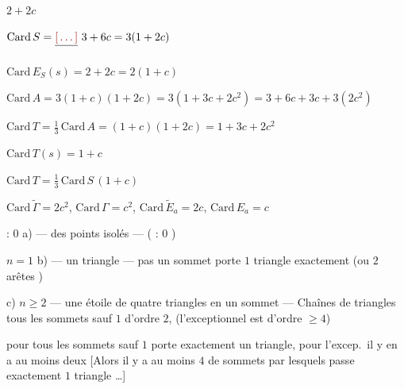 \documentclass[11pt,a4paper]{article}
\begin{document}

$2+2c$ \qquad {}

$\mathrm{Card}\,S=\struck{\ill{}}\ 3+6c=3(1+2c)$

$\mathrm{Card}\,E_S(s)=2+2c=2(1+c)$

$\mathrm{Card}\,A=3(1+c)(1+2c)=3(1+3c+2c^2)=3+6c+3c+3(2c^2)$

$\mathrm{Card}\,T=\tfrac13\,\mathrm{Card}\,A=(1+c)(1+2c)=1+3c+2c^2$


$\mathrm{Card}\,T(s)=1+c$ \struck{\ill{}} \qquad
{}

$\mathrm{Card}\,T=\tfrac13\,\mathrm{Card}\,S\,(1+c)$

$\mathrm{Card}\,\widetilde{\Gamma}=2c^2$, \quad $\mathrm{Card}\,\Gamma=c^2$,
\quad $\mathrm{Card}\,\widetilde{E}_a=2c$, \quad $\mathrm{Card}\,E_a=c$



\ill{}  \ill{} : $0$  a) — des points isolés
—  (\ill{} : $0$ )

\ill{}  $n=1$  b) — un triangle
— pas un sommet porte $1$ triangle exactement (ou $2$ arêtes
)

c) $n\geqslant2$  — une étoile de quatre triangles en un sommet
— \struck{\ill{}} Chaînes de triangles \ill{}  tous les
sommets \ill{} sauf $1$ d'ordre $2$,  (l'exceptionnel est d'ordre
$\geqslant4$)

pour tous les sommets sauf $1$ porte exactement un triangle, pour l'excep.\ il y en
a au moins deux [Alors il y a au moins $4$ de sommets par lesquels passe
exactement $1$ triangle …]
\end{document}
